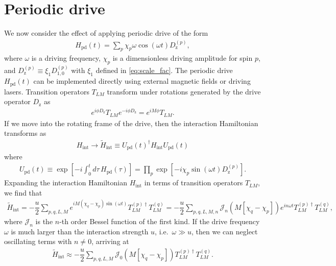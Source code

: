 \documentclass[nofootinbib,notitlepage,11pt]{revtex4-2}
\renewcommand{\t}{\text} %
\newcommand{\f}[2]{\dfrac{#1}{#2}} %
\newcommand{\p}[1]{\left(#1\right)} %
\renewcommand{\sp}[1]{\left[#1\right]} %
\newcommand{\1}{\mathds{1}}
\newcommand{\z}{\text{z}}
\newcommand{\J}{\mathcal{J}}
\begin{document}
\section{Periodic drive}

We now consider the effect of applying periodic drive of the form
\begin{align}
  H_{\t{pd}}\p{t} = \sum_p \chi_p \omega \cos\p{\omega t} D_\z^{(p)},
\end{align}
where $\omega$ is a driving frequency, $\chi_p$ is a dimensionless
driving amplitude for spin $p$, and
$D_\z^{(p)} \equiv \xi_1 D_{1,0}^{(p)}$ with $\xi_1$ defined in
\eqref{eq:scale_fac}.  The periodic drive $H_{\t{pd}}\p{t}$ can be
implemented directly using external magnetic fields or driving lasers.
Transition operators $T_{LM}$ transform under rotations generated by
the drive operator $D_\z$ as
\begin{align}
  e^{i\phi D_\z} T_{LM} e^{-i\phi D_\z} = e^{iM\phi} T_{LM}.
\end{align}
If we move into the rotating frame of the drive, then the interaction
Hamiltonian transforms as
\begin{align}
  H_{\t{int}} \to \tilde H_{\t{int}}
  \equiv U_{\t{pd}}\p{t}^\dag H_{\t{int}} U_{\t{pd}}\p{t}
\end{align}
where
\begin{align}
  U_{\t{pd}}\p{t} \equiv \exp\sp{-i\int_0^td\tau\,H_{\t{pd}}\p{\tau}}
  = \prod_p \exp\sp{-i \chi_p \sin\p{\omega t} D_\z^{(p)}}.
\end{align}
Expanding the interaction Hamiltonian $H_{\t{int}}$ in terms of
transition operators $T_{LM}$, we find that
\begin{align}
  \tilde H_{\t{int}}
  = -\f{u}{2} \sum_{p,q,L,M} e^{iM\p{\chi_q-\chi_p}\sin\p{\omega t}}
  T_{LM}^{(p)\dag} T_{LM}^{(q)}
  = -\f{u}{2} \sum_{p,q,L,M,n}
  \J_n\p{M\sp{\chi_q-\chi_p}} e^{in\omega t}
  T_{LM}^{(p)\dag} T_{LM}^{(q)},
\end{align}
where $\J_n$ is the $n$-th order Bessel function of the first kind.
If the drive frequency $\omega$ is much larger than the interaction
strength $u$, i.e.~$\omega\gg u$, then we can neglect oscillating
terms with $n\ne0$, arriving at
\begin{align}
  \tilde H_{\t{int}} \approx -\f{u}{2} \sum_{p,q,L,M}
  \J_0\p{M\sp{\chi_q-\chi_p}}
  T_{LM}^{(p)\dag} T_{LM}^{(q)}.
\end{align}

\end{document}
